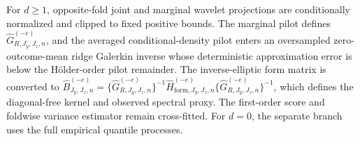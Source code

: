 For \(d\ge1\), opposite-fold joint and marginal wavelet projections are conditionally normalized and clipped to fixed positive bounds.  The marginal pilot defines \(\widehat G_{R,J_y,J_z,n}^{(-e)}\), and the averaged conditional-density pilot enters an oversampled zero-outcome-mean ridge Galerkin inverse whose deterministic approximation error is below the H\"older-order pilot remainder.  The inverse-elliptic form matrix is converted to \(\widehat B_{J_y,J_z,n}^{(-e)}=\{\widehat G_{R,J_y,J_z,n}^{(-e)}\}^{-1}\widehat H_{\mathrm{form},J_y,J_z,n}^{(-e)}\{\widehat G_{R,J_y,J_z,n}^{(-e)}\}^{-1}\), which defines the diagonal-free kernel and observed spectral proxy.  The first-order score and foldwise variance estimator remain cross-fitted.  For \(d=0\), the separate branch uses the full empirical quantile processes.